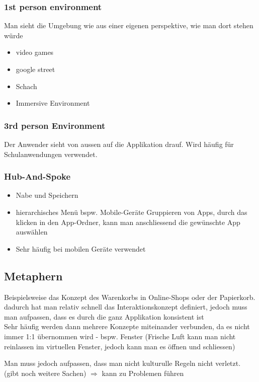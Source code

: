 \documentclass{report}
\theoremstyle{definition}
\theoremstyle{example}
\begin{document}
 \subsubsection{1st person environment}
 Man sieht die Umgebung wie aus einer eigenen perspektive, wie man dort stehen würde
 \begin{itemize}
    \item video games
    \item google street 
    \item Schach
    \item Immersive Environment
 \end{itemize}

 \subsubsection{3rd person Environment}
 Der Anwender sieht von aussen auf die Applikation drauf. Wird häufig für Schulanwendungen verwendet.

 \subsubsection{Hub-And-Spoke}
 \begin{itemize}
    \item Nabe und Speichern
    \item hierarchisches Menü
    \subitem bspw. Mobile-Geräte Gruppieren von Apps, durch das klicken in den App-Ordner, kann man anschliessend die gewünschte App auswählen 
    \item Sehr häufig bei mobilen Geräte verwendet
 \end{itemize}

 \subsection{Metaphern}
 Beispielsweise das Konzept des Warenkorbs in Online-Shops oder der Papierkorb.\\
 dadurch hat man relativ schnell das Interaktionskonzept definiert, jedoch muss man aufpassen, dass es durch die ganz Applikation konsistent ist\\
 Sehr häufig werden dann mehrere Konzepte miteinander verbunden, da es nicht immer 1:1 übernommen wird - bspw. Fenster (Frische Luft kann man nicht reinlassen im virtuellen Fenster, jedoch kann man es öffnen und schliessen)

 Man muss jedoch aufpassen, dass man nicht kulturulle Regeln nicht verletzt. (gibt noch weitere Sachen) $\Rightarrow$ kann zu Problemen führen
\end{document}
